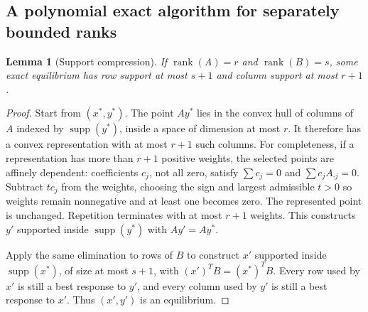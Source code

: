 \documentclass[11pt,a4paper]{article}
\newtheorem{lemma}[theorem]{Lemma}
\theoremstyle{definition}
\theoremstyle{remark}
\begin{document}
\subsection{A polynomial exact algorithm for separately bounded ranks}
\begin{lemma}[Support compression]
If $\operatorname{rank}(A)=r$ and $\operatorname{rank}(B)=s$, some exact equilibrium has row support at most $s+1$ and column support at most $r+1$.
\end{lemma}
\begin{proof}
Start from $(x^*,y^*)$. The point $Ay^*$ lies in the convex hull of columns of $A$ indexed by $\operatorname{supp}(y^*)$, inside a space of dimension at most $r$. It therefore has a convex representation with at most $r+1$ such columns. For completeness, if a representation has more than $r+1$ positive weights, the selected points are affinely dependent: coefficients $c_j$, not all zero, satisfy $\sum c_j=0$ and $\sum c_jA_{\cdot j}=0$. Subtract $t c_j$ from the weights, choosing the sign and largest admissible $t>0$ so weights remain nonnegative and at least one becomes zero. The represented point is unchanged. Repetition terminates with at most $r+1$ weights. This constructs $y'$ supported inside $\operatorname{supp}(y^*)$ with $Ay'=Ay^*$.

Apply the same elimination to rows of $B$ to construct $x'$ supported inside $\operatorname{supp}(x^*)$, of size at most $s+1$, with $(x')^TB=(x^*)^TB$. Every row used by $x'$ is still a best response to $y'$, and every column used by $y'$ is still a best response to $x'$. Thus $(x',y')$ is an equilibrium.
\end{proof}
\end{document}
